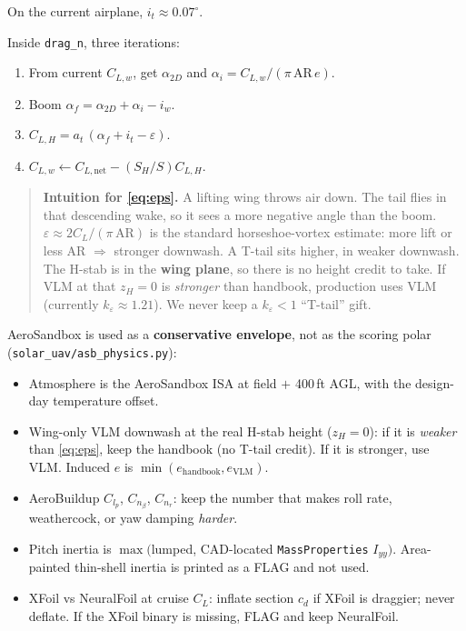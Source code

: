 \documentclass[11pt,letterpaper]{article}
\newcommand{\code}[1]{\texttt{#1}}
\newenvironment{intuition}{\begin{quote}\small}{\end{quote}}
\begin{document}
On the current airplane, $i_t \approx 0.07^\circ$.

Inside \code{drag\_n}, three iterations:

\begin{enumerate}
  \item From current $C_{L,w}$, get $\alpha_{2D}$ and $\alpha_i = C_{L,w}/(\pi\,\mathrm{AR}\,e)$.
  \item Boom $\alpha_f = \alpha_{2D} + \alpha_i - i_w$.
  \item $C_{L,H} = a_t\,(\alpha_f + i_t - \varepsilon)$.
  \item $C_{L,w} \leftarrow C_{L,\mathrm{net}} - (S_H/S) C_{L,H}$.
\end{enumerate}

\begin{intuition}
\textbf{Intuition for \eqref{eq:eps}.} A lifting wing throws air down. The tail flies in that descending wake, so it sees a more negative angle than the boom. $\varepsilon \approx 2C_L/(\pi\,\mathrm{AR})$ is the standard horseshoe-vortex estimate: more lift or less AR $\Rightarrow$ stronger downwash. A T-tail sits higher, in weaker downwash. The H-stab is in the \textbf{wing plane}, so there is no height credit to take. If VLM at that $z_H=0$ is \emph{stronger} than handbook, production uses VLM (currently $k_\varepsilon \approx 1.21$). We never keep a $k_\varepsilon<1$ ``T-tail'' gift.
\end{intuition}

AeroSandbox is used as a \textbf{conservative envelope}, not as the scoring polar (\code{solar\_uav/asb\_physics.py}):

\begin{itemize}
  \item Atmosphere is the AeroSandbox ISA at field $+$ 400\,ft AGL, with the design-day temperature offset.
  \item Wing-only VLM downwash at the real H-stab height ($z_H=0$): if it is \emph{weaker} than \eqref{eq:eps}, keep the handbook (no T-tail credit). If it is stronger, use VLM. Induced $e$ is $\min(e_\mathrm{handbook}, e_\mathrm{VLM})$.
  \item AeroBuildup $C_{l_p}$, $C_{n_\beta}$, $C_{n_r}$: keep the number that makes roll rate, weathercock, or yaw damping \emph{harder}.
  \item Pitch inertia is $\max($lumped, CAD-located \code{MassProperties} $I_{yy})$. Area-painted thin-shell inertia is printed as a FLAG and not used.
  \item XFoil vs NeuralFoil at cruise $C_L$: inflate section $c_d$ if XFoil is draggier; never deflate. If the XFoil binary is missing, FLAG and keep NeuralFoil.
\end{itemize}
\end{document}

